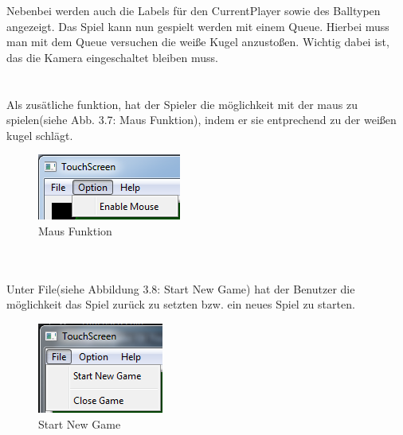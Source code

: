 Nebenbei werden auch die Labels für den CurrentPlayer sowie des Balltypen angezeigt.
Das Spiel kann nun gespielt werden mit einem Queue. Hierbei muss man mit dem  Queue versuchen die weiße Kugel anzustoßen. Wichtig dabei ist, das die Kamera eingeschaltet bleiben muss.
\\\\\\
Als zusätliche funktion, hat der Spieler die möglichkeit mit der maus zu spielen(siehe Abb. 3.7: Maus Funktion), indem er sie entprechend zu der weißen kugel schlägt.
\begin{figure}[h]
	\centering
	\caption{Maus Funktion}
	\includegraphics[width=\textwidth/3]{bilder/option-MenuBar.png}
\end{figure}\\\\
Unter File(siehe Abbildung 3.8: Start New Game) hat der Benutzer die möglichkeit das Spiel zurück zu setzten bzw. ein neues Spiel zu starten.
\begin{figure}[h]
	\centering
	\caption{Start New Game}
	\includegraphics[width=\textwidth/3]{bilder/File-MenuBar.png}
\end{figure}\\

